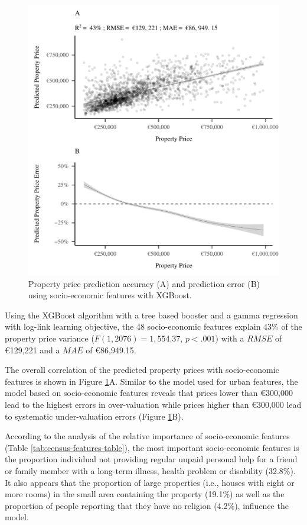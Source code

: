 \documentclass[conference,final,]{IEEEtran}
\begin{document}
\begin{figure}[!h]
\includegraphics[width=0.98\columnwidth]{manuscript_files/figure-latex/census-features-xgb-1} \caption{Property price prediction accuracy (A) and prediction error (B) using socio-economic features with XGBoost.}\label{fig:census-features-xgb}
\end{figure}

Using the XGBoost algorithm with a tree based booster and a gamma regression with log-link learning objective, the 48 socio-economic features explain 43\% of the property price variance (\(F(1, 2076) = 1,554.37\), \(p < .001\)) with a \(RMSE\) of €129,221 and a \(MAE\) of €86,949.15.

The overall correlation of the predicted property prices with socio-economic features is shown in Figure \ref{fig:census-features-xgb}A. Similar to the model used for urban features, the model based on socio-economic features reveals that prices lower than €300,000 lead to the highest errors in over-valuation while prices higher than €300,000 lead to systematic under-valuation errors (Figure \ref{fig:census-features-xgb}B).

According to the analysis of the relative importance of socio-economic features (Table \ref{tab:census-features-table}), the most important socio-economic features is the proportion individual not providing regular unpaid personal help for a friend or family member with a long-term illness, health problem or disability (32.8\%). It also appears that the proportion of large properties (i.e., houses with eight or more rooms) in the small area containing the property (19.1\%) as well as the proportion of people reporting that they have no religion (4.2\%), influence the model.
\end{document}
